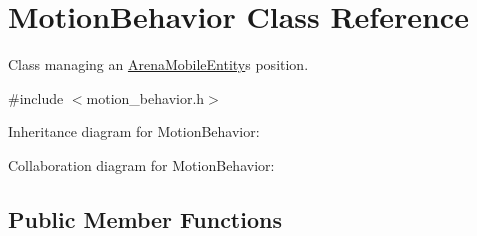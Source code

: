 \hypertarget{classMotionBehavior}{}\section{Motion\+Behavior Class Reference}
\label{classMotionBehavior}


Class managing an \hyperlink{classArenaMobileEntity}{Arena\+Mobile\+Entity}\textquotesingle{}s position.  




{\ttfamily \#include $<$motion\+\_\+behavior.\+h$>$}



Inheritance diagram for Motion\+Behavior\+:


Collaboration diagram for Motion\+Behavior\+:
\subsection*{Public Member Functions}
